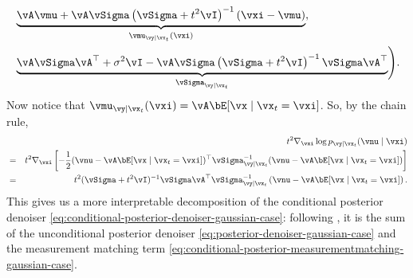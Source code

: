 \documentclass[../../book-main.tex]{subfiles}
\begin{document}
\begin{example}
\begin{equation}
\begin{split}
                &\underbrace{%
                    \vA\vmu + \vA\vSigma\left( \vSigma + t^2 \vI \right)^{-1}
                    \left(
                        \vxi - \vmu
                    \right)
                }_{\vmu_{\vy \mid \vx_t}(\vxi)}, \\
                &\underbrace{%
                    \vA\vSigma\vA^\top + \sigma^2 \vI - \vA\vSigma
                    \left( \vSigma
                    + t^2 \vI\right)^{-1} \vSigma \vA^\top
                }_{\vSigma_{\vy\mid \vx_t}}
            \Biggr).
        \end{split}
    \end{equation}
    Now notice that $\vmu_{\vy \mid \vx_t}(\vxi) = \vA \bE[\vx \mid
    \vx_t=\vxi]$.
    So, by the chain rule,
    \begin{eqnarray}
        &&t^2 \nabla_{\vxi} \log p_{\vy \mid \vx_t}(\vnu \mid \vxi)\nonumber \\
        &=&
        t^2 \nabla_{\vxi}\left[
            -\frac{1}{2}
            (\vnu - \vA \bE[\vx \mid \vx_t=\vxi])^\top
            \vSigma_{\vy \mid \vx_t}^{-1}
            (\vnu - \vA \bE[\vx \mid \vx_t=\vxi])
        \right]\nonumber
        \\
        &=& t^2 (\vSigma+t^2 \vI)^{-1}\vSigma\vA^\top\vSigma_{\vy \mid
        \vx_t}^{-1}\left(
        \vnu - \vA \bE[\vx \mid \vx_t=\vxi] \right).
        \label{eq:conditional-posterior-measurementmatching-gaussian-case}
    \end{eqnarray}
    This gives us a more interpretable decomposition of the
    conditional posterior
    denoiser \eqref{eq:conditional-posterior-denoiser-gaussian-case}: following
    , it is the sum of the
    unconditional posterior denoiser \eqref{eq:posterior-denoiser-gaussian-case}
    and the measurement matching term
    \eqref{eq:conditional-posterior-measurementmatching-gaussian-case}.


\end{example}
\end{document}
